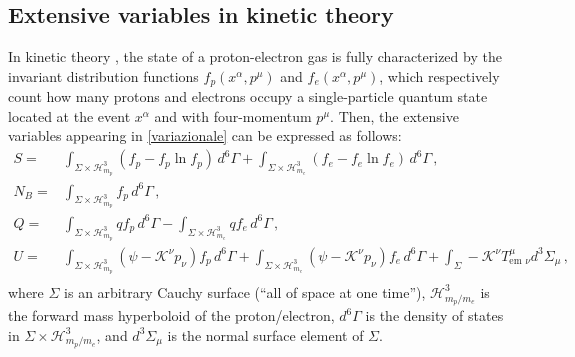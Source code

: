 \documentclass[a4paper, amsfonts, amssymb, amsmath, reprint, showkeys, nofootinbib, twoside, onecolumn,notitlepage]{revtex4-1}
\newcommand{\K}{{\mathcal{K}}}
\theoremstyle{definition}
\theoremstyle{theorem}
\begin{document}
\vspace{-0.3cm}
\subsection{Extensive variables in kinetic theory}
\vspace{-0.3cm}

In kinetic theory \cite{cercignani_book,Groot1980RelativisticKT}, the state of a proton-electron gas is fully characterized by the invariant distribution functions $f_p(x^\alpha,p^\mu)$ and $f_e(x^\alpha,p^\mu)$, which respectively count how many protons and electrons occupy a single-particle quantum state located at the event $x^\alpha$ and with four-momentum $p^\mu$. Then, the extensive variables appearing in \eqref{variazionale} can be expressed as follows:
\begin{equation}\label{SNBQU}
\begin{split}
S ={}& \int_{\Sigma \times \mathcal{H}^3_{m_p}} \left(f_p{-}f_p \ln f_p\right)\, d^6\Gamma +\int_{\Sigma \times \mathcal{H}^3_{m_e}} \left( f_e{-}f_e \ln f_e \right)\, d^6\Gamma \, , \\
N_B ={}& \int_{\Sigma \times \mathcal{H}^3_{m_p}} f_p \, d^6 \Gamma \, , \\
Q ={}& \int_{\Sigma \times \mathcal{H}^3_{m_p}} qf_p\, d^6\Gamma -\int_{\Sigma \times \mathcal{H}^3_{m_e}} qf_e\, d^6\Gamma \, , \\
U ={}& \int_{\Sigma \times \mathcal{H}^3_{m_p}} (\psi-\K^\nu p_\nu) f_p\, d^6\Gamma +\int_{\Sigma \times \mathcal{H}^3_{m_e}} (\psi-\K^\nu p_\nu) f_e\, d^6\Gamma +\int_\Sigma -\K^\nu T^\mu_{\text{em }\nu} d^3\Sigma_\mu \, , \\
\end{split}
\end{equation}
where $\Sigma$ is an arbitrary Cauchy surface (``all of space at one time''), $\mathcal{H}^3_{m_p/m_e}$ is the forward mass hyperboloid of the proton/electron, $d^6\Gamma$ is the density of states in $\Sigma \times \mathcal{H}^3_{m_p/m_e}$, and $d^3\Sigma_\mu$ is the normal surface element of $\Sigma$.
\end{document}
